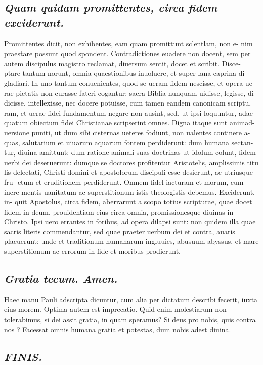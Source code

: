 \documentclass{article}
\begin{document}
\begin{pages}
\subsection*{\textit{Quam quidam promittentes, circa fidem exciderunt. }}\pstart Promittentes dicit, non exhibentes, eam quam promittunt sclentlam, non e- nim praestare possunt quod spondent. Contradictiones euadere non docent, sem per autem discipulus magistro reclamat, diuersum sentit, docet et scribit. Disce- ptare tantum norunt, omnia quaestionibus inuoluere, et super lana caprina di- gladiari. In uno tantum conuenientes, quod se ueram fidem nescisse, et opera ue rae pietatis non curasse fateri cogantur: sacra Biblia nunquam uidisse, legisse, di- dicisse, intellexisse, nec docere potuisse, cum tamen eandem canonicam scriptu, ram, et uerae fidei fundamentum negare non ausint, sed, ut ipsi loquuntur, adae- quatum obiectum fidei Christianae scripserint omnes. Digna itaque sunt animad- uersione puniti, ut dum sibi cisternas ueteres fodiunt, non ualentes continere a- quas, salutarium et uiuarum aquarum fontem perdiderunt: dum humana sectan- tur, diuina amittunt: dum ratione animali suas doctrinas ut idolum colunt, fidem uerbi dei deseruerunt: dumque se doctores profitentur Aristotelis, amplissimis titu lis delectati, Christi domini et apostolorum discipuli esse desierunt, ac utriusque fru- ctum et eruditionem perdiderunt. Omnem fidel iacturam et morum, cum incre mentis uanitatum ac superstitionum istis theologistis debemus. Exciderunt, in- quit Apostolus, circa fidem, aberrarunt a scopo totius scripturae, quae docet fidem in deum, prouidentiam eius circa omnia, promissionesque diuinas in Christo. Ipsi uero errantes in foribus, ad opera dilapsi sunt: non quidem illa quae sacris literis commendantur, sed quae praeter uerbum dei et contra, auaris placuerunt: unde et traditionum humanarum ingluuies, abusuum abyssus, et mare superstitionum ac errorum in fide et moribus prodierunt.  \pend
{}
{}
\subsection*{\textit{Gratia tecum. Amen. }}\pstart Haec manu Pauli adscripta dicuntur, cum alia per dictatum describi fecerit, iuxta eius morem. Optima autem est imprecatio. Quid enim molestiarum non tolerabimus, si dei assit gratia, in quam speramus? Si deus pro nobis, quis contra nos ? Facessat omnis humana gratia et potestas, dum nobis adest diuina.  \pend
{}
{}
\subsection*{\textit{FINIS. }}
\endnumbering
\end{pages}
\end{document}
